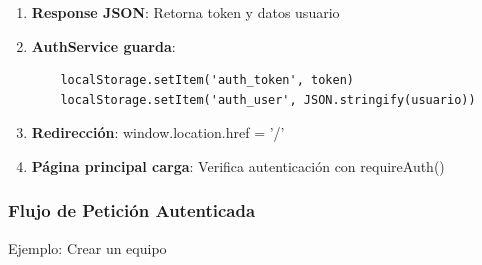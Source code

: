 \documentclass[12pt,a4paper]{article}
\begin{document}
\begin{enumerate}[leftmargin=*]
    \item \textbf{Response JSON}: Retorna token y datos usuario

    \item \textbf{AuthService guarda}:
    \begin{verbatim}
    localStorage.setItem('auth_token', token)
    localStorage.setItem('auth_user', JSON.stringify(usuario))
    \end{verbatim}

    \item \textbf{Redirección}: window.location.href = '/'

    \item \textbf{Página principal carga}: Verifica autenticación con requireAuth()
\end{enumerate}

\subsubsection{Flujo de Petición Autenticada}

Ejemplo: Crear un equipo
\end{document}
